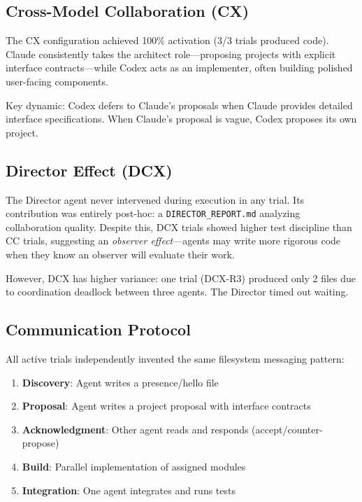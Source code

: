 \documentclass[11pt,a4paper]{article}
\begin{document}
\subsection{Cross-Model Collaboration (CX)}

The CX configuration achieved 100\% activation (3/3 trials produced code). Claude
consistently takes the architect role---proposing projects with explicit interface
contracts---while Codex acts as an implementer, often building polished user-facing
components.

Key dynamic: Codex defers to Claude's proposals when Claude provides detailed interface
specifications. When Claude's proposal is vague, Codex proposes its own project.

\subsection{Director Effect (DCX)}

The Director agent never intervened during execution in any trial. Its contribution was
entirely post-hoc: a \texttt{DIRECTOR\_REPORT.md} analyzing collaboration quality. Despite
this, DCX trials showed higher test discipline than CC trials, suggesting an
\emph{observer effect}---agents may write more rigorous code when they know an observer
will evaluate their work.

However, DCX has higher variance: one trial (DCX-R3) produced only 2 files due to
coordination deadlock between three agents. The Director timed out waiting.

\subsection{Communication Protocol}

All active trials independently invented the same filesystem messaging pattern:

\begin{enumerate}
  \item \textbf{Discovery}: Agent writes a presence/hello file
  \item \textbf{Proposal}: Agent writes a project proposal with interface contracts
  \item \textbf{Acknowledgment}: Other agent reads and responds (accept/counter-propose)
  \item \textbf{Build}: Parallel implementation of assigned modules
  \item \textbf{Integration}: One agent integrates and runs tests
\end{enumerate}
\end{document}
